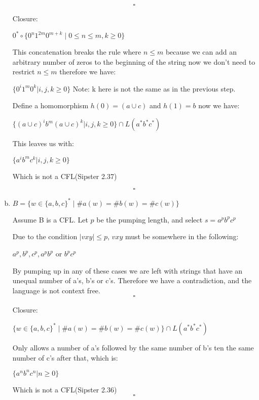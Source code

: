 \documentclass{article}
\begin{document}
\begin{enumerate}[(a)]
    \[ \square \]

    Closure:

    $0^* \circ \{ 0^n 1^{2m} 0^{m+k} \;|\; 0 \le n \le m, k \ge 0 \}$

    This concatenation breaks the rule where $n \leq m$ because we can add an arbitrary number
    of zeros to the beginning of the string now we don't need
    to restrict $n \leq m$ therefore we have:

    $\{0^i1^m0^k | i,j,k \geq 0\}$ Note: k here is not the same as in the previous step.

    Define a homomorphism $h(0) = (a \cup c)$ and $h(1) = b$ now we have:

    $\{(a \cup c)^ib^m(a \cup c)^k | i,j,k \geq 0\} \cap L(a^*b^*c^*)$

    This leaves us with:

    $\{a^ib^mc^k | i,j,k \geq 0\}$

    Which is not a CFL(Sipster 2.37)

    \[ \square \]

    \item $B = \{w\in \{a,b,c\}^* \;|\; \#a(w)=\#b(w)=\#c(w)\}$

    Assume B is a CFL. Let $p$ be the pumping length, and select $s = a^pb^pc^p$

    Due to the condition  $|vxy| \leq p$, $vxy$ must be somewhere in the following:

    $a^p, b^p, c^p, a^pb^p$ or $b^pc^p$

    By pumping up in any of these cases we are left with strings that have an
    unequal number of a's, b's or c's. Therefore we have a contradiction,
    and the language is not context free.
    \[ \square \]

    Closure:

    $\{w\in \{a,b,c\}^* \;|\; \#a(w)=\#b(w)=\#c(w)\} \cap L(a^*b^*c^*)$

    Only allows a number of a's followed by the same number of b's ten the same
    number of c's after that, which is:

    $\{a^nb^nc^n | n \geq 0\}$

    Which is not a CFL(Sipster 2.36)
    \[ \square \]

    \end{enumerate}

    \newpage
\end{document}
